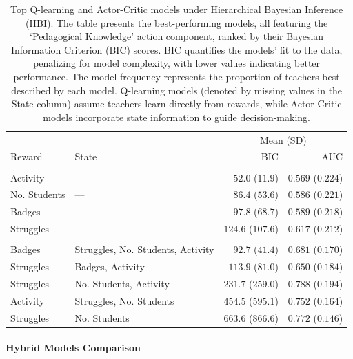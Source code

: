 \documentclass[
  number,
  preprint,
  3p,
  onecolumn]{elsarticle}
\let\oldparagraph\paragraph
\renewcommand{\paragraph}[1]{\oldparagraph{#1}\mbox{}}
\begin{document}
\begin{longtable}{llrr}

\caption{\label{tbl-CBM-HBI}Top Q-learning and Actor-Critic models under
Hierarchical Bayesian Inference (HBI). The table presents the
best-performing models, all featuring the `Pedagogical Knowledge' action
component, ranked by their Bayesian Information Criterion (BIC) scores.
BIC quantifies the models' fit to the data, penalizing for model
complexity, with lower values indicating better performance. The model
frequency represents the proportion of teachers best described by each
model. Q-learning models (denoted by missing values in the State column)
assume teachers learn directly from rewards, while Actor-Critic models
incorporate state information to guide decision-making.}

\tabularnewline

\toprule
 &  & \multicolumn{2}{c}{Mean (SD)} \\ 
\cmidrule(lr){3-4}
Reward & State & BIC & AUC \\ 
\midrule\addlinespace[2.5pt]
\multicolumn{4}{l}{Q-learning} \\ 
\midrule\addlinespace[2.5pt]
Activity & — & $52.0$ ($11.9$) & $0.569$ ($0.224$) \\ 
No. Students & — & $86.4$ ($53.6$) & $0.586$ ($0.221$) \\ 
Badges & — & $97.8$ ($68.7$) & $0.589$ ($0.218$) \\ 
Struggles & — & $124.6$ ($107.6$) & $0.617$ ($0.212$) \\ 
\midrule\addlinespace[2.5pt]
\multicolumn{4}{l}{Actor-Critic} \\ 
\midrule\addlinespace[2.5pt]
Badges & Struggles, No. Students, Activity & $92.7$ ($41.4$) & $0.681$ ($0.170$) \\ 
Struggles & Badges, Activity & $113.9$ ($81.0$) & $0.650$ ($0.184$) \\ 
Struggles & No. Students, Activity & $231.7$ ($259.0$) & $0.788$ ($0.194$) \\ 
Activity & Struggles, No. Students & $454.5$ ($595.1$) & $0.752$ ($0.164$) \\ 
Struggles & No. Students & $663.6$ ($866.6$) & $0.772$ ($0.146$) \\ 
\bottomrule

\end{longtable}

\paragraph{Hybrid Models Comparison}\label{hybrid-models-comparison}
\end{document}
